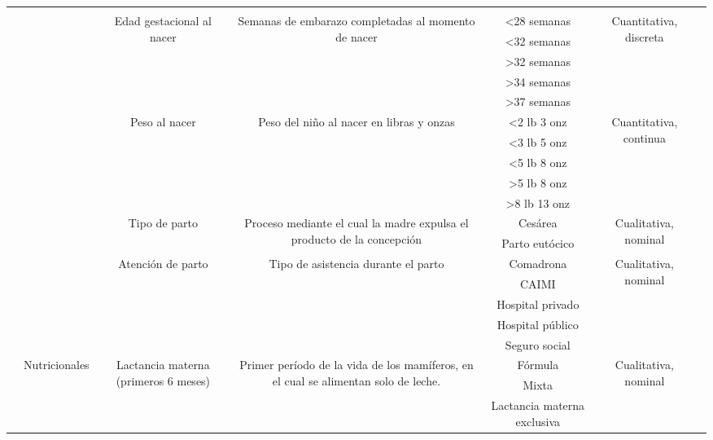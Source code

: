 \documentclass[11pt,letterpaper]{report}
\begin{document}
\begin{landscape}
\begin{longtable}{|c|c|c|c|c|c|c|}
 &  &  &  &  &  &  \\ \cline{3-6}
 &  & \multirow{5}{*}{Edad gestacional al nacer} & \multirow{5}{*}{Semanas de embarazo completadas al momento de nacer} & \textless 28 semanas & \multirow{5}{*}{Cuantitativa, discreta} &  \\ \cline{5-5}
 &  &  &  & \textless 32 semanas &  &  \\ \cline{5-5}
 &  &  &  & \textgreater 32 semanas &  &  \\ \cline{5-5}
 &  &  &  & \textgreater 34 semanas &  &  \\ \cline{5-5}
 &  &  &  & \textgreater 37 semanas &  &  \\ \cline{3-6}
 &  & \multirow{5}{*}{Peso al nacer} & \multirow{5}{*}{Peso del niño al nacer en libras y onzas} & \textless 2 lb 3 onz & \multirow{5}{*}{Cuantitativa, continua} &  \\ \cline{5-5}
 &  &  &  & \textless 3 lb 5 onz &  &  \\ \cline{5-5}
 &  &  &  & \textless 5 lb 8 onz &  &  \\ \cline{5-5}
 &  &  &  & \textgreater 5 lb 8 onz &  &  \\ \cline{5-5}
 &  &  &  & \textgreater 8 lb 13 onz &  &  \\ \cline{3-6}
 &  & \multirow{2}{*}{Tipo de parto} & \multirow{2}{*}{Proceso mediante el cual la madre expulsa el producto de la concepción} & Cesárea & \multirow{2}{*}{Cualitativa, nominal} &  \\ \cline{5-5}
 &  &  &  & Parto eutócico &  &  \\ \cline{3-6}
 &  & \multirow{5}{*}{Atención de parto} & \multirow{5}{*}{Tipo de asistencia durante el parto} & Comadrona & \multirow{5}{*}{Cualitativa, nominal} &  \\ \cline{5-5}
 &  &  &  & CAIMI &  &  \\ \cline{5-5}
 &  &  &  & Hospital privado &  &  \\ \cline{5-5}
 &  &  &  & Hospital público &  &  \\ \cline{5-5}
 &  &  &  & Seguro social &  &  \\ \cline{2-6}
 & \multirow{19}{*}{Nutricionales} & \multirow{3}{*}{Lactancia materna (primeros 6 meses)} & \multirow{3}{*}{Primer período de la vida de los mamíferos, en el cual se alimentan solo de leche.} & Fórmula & \multirow{3}{*}{Cualitativa, nominal} &  \\ \cline{5-5}
 &  &  &  & Mixta &  &  \\ \cline{5-5}
 &  &  &  & Lactancia materna exclusiva &  &  \\ \cline{3-6}

\end{longtable}
\end{landscape}
\end{document}
